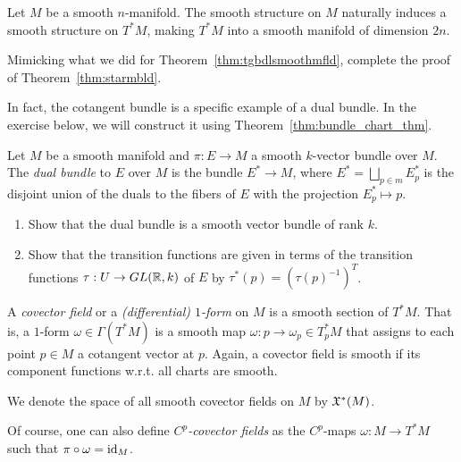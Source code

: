 \begin{theorem}\label{thm:starmbld}
	Let $M$ be a smooth $n$-manifold.
	The smooth structure on $M$ naturally induces a smooth structure on $T^*M$, making $T^*M$ into a smooth manifold of dimension $2n$.
\end{theorem}
\begin{exercise}\label{exe:prooftstarmbld}
	Mimicking what we did for Theorem~\ref{thm:tgbdlsmoothmfld}, complete the proof of Theorem~\ref{thm:starmbld}.
\end{exercise}

In fact, the cotangent bundle is a specific example of a dual bundle.
In the exercise below, we will construct it using Theorem~\ref{thm:bundle_chart_thm}.
\begin{exercise}
	Let $M$ be a smooth manifold and $\pi:E\to M$ a smooth $k$-vector bundle over $M$.
	The \emph{dual bundle} to $E$ over $M$ is the bundle $E^* \to M$, where $E^* = \bigsqcup_{p\in m} E_p^*$ is the disjoint union of the duals to the fibers of $E$ with the projection $E_p^* \mapsto p$.
	\begin{enumerate}
		\item Show that the dual bundle is a smooth vector bundle of rank $k$.
		\item Show that the transition functions are given in terms of the transition functions $\tau : U\to GL(\mathbb{R},k)$ of $E$ by $\tau^*(p) = (\tau(p)^{-1})^T$.
	\end{enumerate}
\end{exercise}

\begin{definition}\label{def:covfield}
	A \emph{covector field} or a \emph{(differential) $1$-form} on $M$ is a smooth section of $T^*M$.
	That is, a $1$-form $\omega\in\Gamma(T^*M)$ is a smooth map $\omega: p \to \omega_p \in T_p^*M$ that assigns to each point $p\in M$ a cotangent vector at $p$.
	Again, a covector field is smooth if its component functions w.r.t. all charts are smooth.

	We denote the space of all smooth covector fields on $M$ by $\mathfrak{X}^*(M)$.

	Of course, one can also define \emph{$C^p$-covector fields} as the $C^p$-maps $\omega:M\to T^*M$ such that $\pi\circ\omega = \operatorname{id}_M$.
\end{definition}

